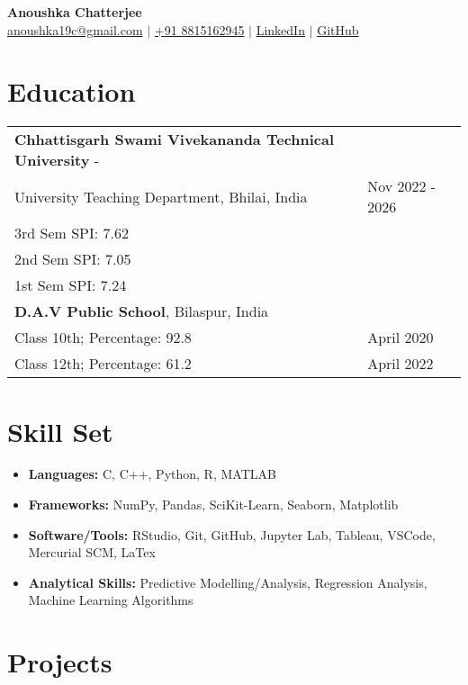 \documentclass[a4paper,10pt]{article}
\begin{document}
\begin{center}
    {\Huge \textbf{Anoushka Chatterjee}} \\
    \vspace{5pt}
    \href{mailto:anoushka19c@gmail.com}{anoushka19c@gmail.com} $|$
    \href{tel:+918815162945}{+91 8815162945} $|$
    \href{https://www.linkedin.com/in/anoushka-chatterjee1}{LinkedIn} $|$
    \href{https://github.com/anoushkaacc}{GitHub} \\
\end{center}

\section*{Education}
\begin{tabular}{p{} p{}}
    \textbf{Chhattisgarh Swami Vivekananda Technical University} - \\ University Teaching Department, Bhilai, India & Nov 2022 - 2026 \\
    3rd Sem SPI: 7.62 & \\
    2nd Sem SPI: 7.05 & \\
    1st Sem SPI: 7.24 & \\
    \textbf{D.A.V Public School}, Bilaspur, India & \\
    Class 10th; Percentage: 92.8 & April 2020 \\
    Class 12th; Percentage: 61.2 & April 2022 \\
\end{tabular}

\section*{Skill Set}
\begin{itemize}
    \item \textbf{Languages:} C, C++, Python, R, MATLAB
    \item \textbf{Frameworks:} NumPy, Pandas, SciKit-Learn, Seaborn, Matplotlib
    \item \textbf{Software/Tools:} RStudio, Git, GitHub, Jupyter Lab, Tableau, VSCode, Mercurial SCM, LaTex
    \item \textbf{Analytical Skills:} Predictive Modelling/Analysis, Regression Analysis, Machine Learning Algorithms 
\end{itemize}

\section*{Projects}
\end{document}
